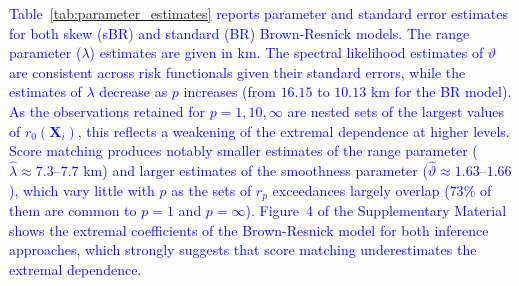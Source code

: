 \documentclass[12pt]{article}
\newcommand{\PZ}{\textcolor{blue}}
\begin{document}
\PZ{Table~\ref{tab:parameter_estimates} reports parameter and standard error estimates for both skew (sBR) and standard (BR) Brown-Resnick models. The range parameter ($\lambda$) estimates are given in km. The spectral likelihood estimates of $\vartheta$ are consistent across risk functionals given their standard errors, while the estimates of $\lambda$ decrease as $p$ increases (from $16.15$ to $10.13$ km for the BR model). As the observations retained for $p=1,10,\infty$ are nested sets of the largest values of $r_0(\bm X_i)$, this reflects a weakening of the extremal dependence at higher levels. Score matching produces notably smaller estimates of the range parameter ($\hat\lambda\approx7.3$--$7.7$ km) and larger estimates of the smoothness parameter ($\hat\vartheta\approx1.63$--$1.66$), which vary little with $p$ as the sets of $r_p$ exceedances largely overlap ($73\%$ of them are common to $p=1$ and $p=\infty$). Figure~4 of the Supplementary Material shows the extremal coefficients of the Brown-Resnick model for both inference approaches, which strongly suggests that score matching underestimates the extremal dependence. }
\end{document}
